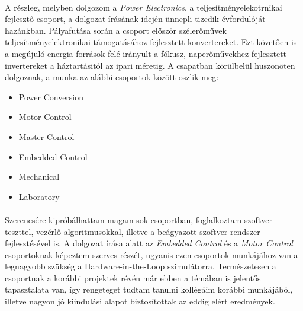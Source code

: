 \paragraph{}
A részleg, melyben dolgozom a \emph{Power Electronics}, a teljesítményelekotrnikai fejlesztő csoport, a dolgozat írásának idején ünnepli tizedik évfordulóját hazánkban. Pályafutása során a csoport először szélerőművek teljesítményelektronikai támogatásához fejlesztett konvertereket. Ezt követően is a megújuló energia források felé irányult a fókusz, naperőművekhez fejlesztett invertereket a háztartásitól az ipari méretig. A csapatban körülbelül huszonöten dolgoznak, a munka az alábbi csoportok között oszlik meg:

\begin{itemize}
	\item{Power Conversion}
	\item{Motor Control}
	\item{Master Control}
	\item{Embedded Control}
	\item{Mechanical}
	\item{Laboratory} 
\end{itemize}

\paragraph{}
Szerencsére kipróbálhattam magam sok csoportban, foglalkoztam szoftver teszttel, vezérlő algoritmusokkal, illetve a beágyazott szoftver rendszer fejlesztésével is. A dolgozat írása alatt az \emph{Embedded Control} és a \emph{Motor Control} csoportoknak képeztem szerves részét, ugyanis ezen csoportok munkájához van a legnagyobb szükség a Hardware-in-the-Loop szimulátorra. Természetesen a csoportnak a korábbi projektek révén már ebben a témában is jelentős tapasztalata van, így rengeteget tudtam tanulni kollégáim korábbi munkájából, illetve nagyon jó kiindulási alapot biztosítottak az eddig elért eredmények.




